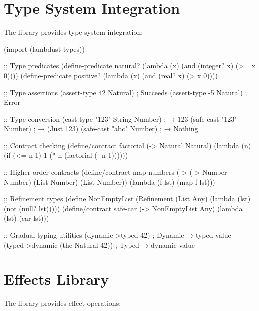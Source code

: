 \section{Type System Integration}
\label{sec:type-integration}


The  library provides type system integration:

\begin{example}
\begin{lambdustcode}
(import (lambdust types))

;; Type predicates
(define-predicate natural? (lambda (x) (and (integer? x) (>= x 0))))
(define-predicate positive? (lambda (x) (and (real? x) (> x 0))))

;; Type assertions
(assert-type 42 Natural)                 ; Succeeds
(assert-type -5 Natural)                 ; Error

;; Type conversion
(cast-type "123" String Number)          ; → 123
(safe-cast "123" Number)                 ; → (Just 123)
(safe-cast "abc" Number)                 ; → Nothing

;; Contract checking
(define/contract factorial
  (-> Natural Natural)
  (lambda (n)
    (if (<= n 1) 1 (* n (factorial (- n 1))))))

;; Higher-order contracts
(define/contract map-numbers
  (-> (-> Number Number) (List Number) (List Number))
  (lambda (f lst) (map f lst)))

;; Refinement types  
(define NonEmptyList (Refinement (List Any) (lambda (lst) (not (null? lst)))))
(define/contract safe-car
  (-> NonEmptyList Any)
  (lambda (lst) (car lst)))

;; Gradual typing utilities
(dynamic->typed 42)                      ; Dynamic → typed value
(typed->dynamic (the Natural 42))        ; Typed → dynamic value
\end{lambdustcode}
\end{example}

\section{Effects Library}
\label{sec:effects-library}


The  library provides effect operations:

